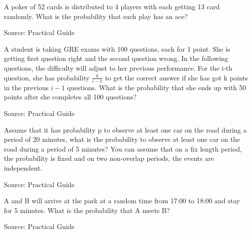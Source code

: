 \begin{exe}[Aces]
A poker of 52 cards is distributed to 4 players with each getting 13 card randomly. What is the probability that each play has an ace?
\end{exe}
Source: Practical Guide
\begin{teacher}
\begin{sol}
\end{sol}
\end{teacher}


\begin{exe}
A student is taking GRE exams with 100 questions, each for 1 point. She is getting first question right and the second question wrong. In the following questions, the difficulty will adjust to her previous performance. For the i-th question, she has probability $\frac{k}{i-1}$ to get the correct answer if she has got k points in the previous $i-1$ questions. What is the probability that she ends up with 50 points after she completes all 100 questions?
\end{exe}
Source: Practical Guide
\begin{teacher}
\begin{sol}
\end{sol}
\end{teacher}

\begin{exe}
Assume that it has probability p to observe at least one car on the road during a period of 20 minutes, what is the probability to observe at least one car on the road during a period of 5 minutes? You can assume that on a fix length period, the probability is fixed and on two non-overlap periods, the events are independent.
\end{exe}
Source: Practical Guide
\begin{teacher}
\begin{sol}
\end{sol}
\end{teacher}

\begin{exe}
A and B will arrive at the park at a random time from 17:00 to 18:00 and stay for 5 minutes. What is the probability that A meets B?
\end{exe}
Source: Practical Guide
\begin{teacher}
\begin{sol}
\end{sol}
\end{teacher}

